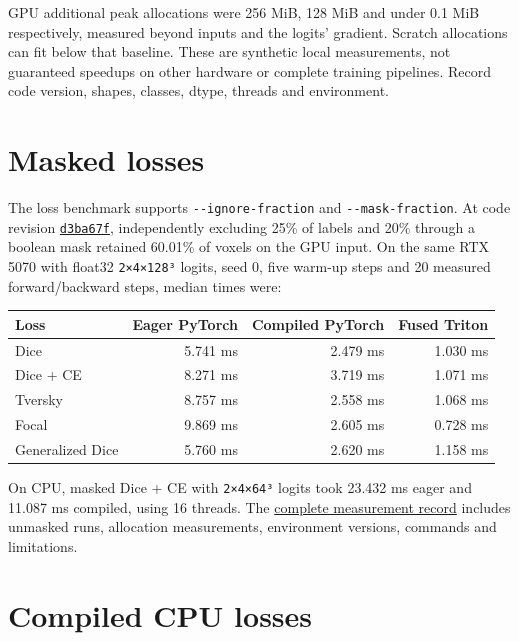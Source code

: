 GPU additional peak allocations were 256 MiB, 128 MiB and under 0.1 MiB respectively, measured
beyond inputs and the logits' gradient. Scratch allocations can fit below that baseline.
These are synthetic local measurements, not guaranteed speedups on other hardware or complete
training pipelines. Record code version, shapes, classes, dtype, threads and environment.

\section{Masked losses}\label{performance:masked-losses}

The loss benchmark supports \texttt{-\/-ignore-fraction} and \texttt{-\/-mask-fraction}. At code revision
\href{https://github.com/rodolfo-viana/exacta/commit/d3ba67fbe8b24ec6b65bdc1f1fa3f813fcb6ad9c}{\texttt{d3ba67f}},
independently excluding 25\% of labels and 20\% through a boolean mask retained 60.01\% of voxels
on the GPU input. On the same RTX 5070 with float32 \texttt{2×4×128³} logits, seed 0, five warm-up
steps and 20 measured forward/backward steps, median times were:

{\small{} %
\begin{longtable}[]{@{}lrrr@{}}
\toprule\noalign{}
Loss & Eager PyTorch & Compiled PyTorch & Fused Triton \\
\midrule\noalign{}
\endhead
\bottomrule\noalign{}
\endlastfoot
Dice & 5.741 ms & 2.479 ms & 1.030 ms \\
Dice + CE & 8.271 ms & 3.719 ms & 1.071 ms \\
Tversky & 8.757 ms & 2.558 ms & 1.068 ms \\
Focal & 9.869 ms & 2.605 ms & 0.728 ms \\
Generalized Dice & 5.760 ms & 2.620 ms & 1.158 ms \\
\end{longtable}
}

On CPU, masked Dice + CE with \texttt{2×4×64³} logits took 23.432 ms eager and 11.087 ms compiled,
using 16 threads. The \href{https://github.com/rodolfo-viana/exacta/blob/v0.0.1a3/benchmarks/results/masking-2026-10-24.md}{complete measurement record}
includes unmasked runs, allocation measurements, environment versions, commands and limitations.

\section{Compiled CPU losses}\label{performance:compiled-cpu-losses}

